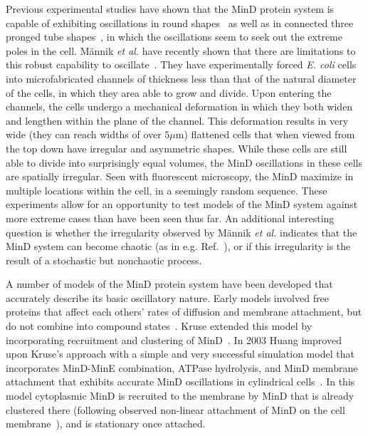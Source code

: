 \documentclass[10pt,letterpaper]{article}
\newcommand\micron{\ensuremath{\mu\text{m}}}
\begin{document}
Previous experimental studies have shown that the MinD protein system
is capable of exhibiting oscillations in round
shapes~\cite{corbin2002exploring,fange2006noise} as well as in
connected three pronged tube shapes~\cite{varma2008min}, in which the
oscillations seem to seek out the extreme poles in the cell.
M\"annik \emph{et al.} have recently shown that there are limitations to
this robust capability to
oscillate~\cite{mannik2012robustness,mannik2009bacterial,mannik2010bacteria}. They
have experimentally forced \emph{E. coli} cells into microfabricated
channels of thickness less than that of the natural diameter of the
cells, in which they area able to grow and divide. Upon entering the
channels, the cells undergo a mechanical deformation in which they
both widen and lengthen within the plane of the channel.  This
deformation results in very wide (they can reach widths of over
$5\micron$) flattened cells that when viewed from the top down have
irregular and asymmetric shapes.  While these cells are still able to
divide into surprisingly equal volumes, the MinD oscillations in these
cells are spatially irregular. Seen with fluorescent microscopy, the
MinD maximize in multiple locations within the cell, in a seemingly
random sequence. These experiments allow for an opportunity to test
models of the MinD system against more extreme cases than have been
seen thus far.  An additional interesting question is whether the
irregularity observed by M\"annik \emph{et al.}  indicates that the MinD
system can become chaotic (as in
e.g. Ref.~), or if this irregularity is
the result of a stochastic but nonchaotic process.
%

A number of models of the MinD protein system have been developed that
accurately describe its basic oscillatory nature.
%
Early models involved free proteins that affect each others' rates of
diffusion and membrane attachment, but do not combine into compound
states~\cite{meinhardt2001pattern}.  Kruse extended this model by
incorporating recruitment and clustering of
MinD~\cite{kruse2002dynamic}.  In 2003 Huang improved upon Kruse's
approach with a simple and very successful simulation model that
incorporates MinD-MinE combination, ATPase hydrolysis, and MinD
membrane attachment that exhibits accurate MinD oscillations in
cylindrical cells~\cite{huang2003dynamic}. In this model cytoplasmic
MinD is recruited to the membrane by MinD that is already clustered
there (following observed non-linear attachment of MinD on the cell
membrane~\cite{hu2002dynamic,shih2002division}), and is stationary
once attached.
%
\end{document}
